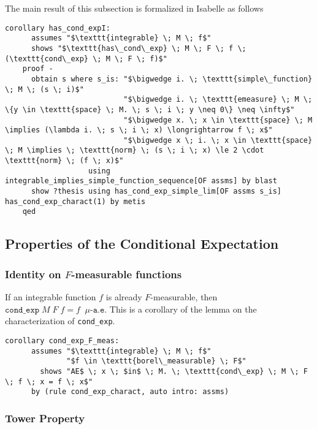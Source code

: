 The main result of this subsection is formalized in Isabelle as follows

\begin{isacorollary}
{\small
	\begin{lstlisting}[style=isabelle]
	corollary has_cond_expI:
	  assumes "$\texttt{integrable} \; M \; f$"
	  shows "$\texttt{has\_cond\_exp} \; M \; F \; f \; (\texttt{cond\_exp} \; M \; F \; f)$"
	proof -
	  obtain s where s_is: "$\bigwedge i. \; \texttt{simple\_function} \; M \; (s \; i)$" 
	  					   "$\bigwedge i. \; \texttt{emeasure} \; M \; \{y \in \texttt{space} \; M. \; s \; i \; y \neq 0\} \neq \infty$" 
						   "$\bigwedge x. \; x \in \texttt{space} \; M \implies (\lambda i. \; s \; i \; x) \longrightarrow f \; x$" 
						   "$\bigwedge x \; i. \; x \in \texttt{space} \; M \implies \; \texttt{norm} \; (s \; i \; x) \le 2 \cdot \texttt{norm} \; (f \; x)$" 
				   using integrable_implies_simple_function_sequence[OF assms] by blast
	  show ?thesis using has_cond_exp_simple_lim[OF assms s_is] has_cond_exp_charact(1) by metis
	qed
	\end{lstlisting}
}
\end{isacorollary}

\subsection{Properties of the Conditional Expectation}

\subsubsection{Identity on $F$-measurable functions}

If an integrable function $f$ is already $F$-measurable, then $\texttt{cond\_exp} \; M \; F \; f = f \;\;\mu\texttt{-a.e.}$ This is a corollary of the lemma on the characterization of \texttt{cond\_exp}.
\begin{isacorollary}
{\small
	\begin{lstlisting}[style=isabelle]
	corollary cond_exp_F_meas:
	  assumes "$\texttt{integrable} \; M \; f$"
			  "$f \in \texttt{borel\_measurable} \; F$"
		shows "AE$ \; x \; $in$ \; M. \; \texttt{cond\_exp} \; M \; F \; f \; x = f \; x$"
	  by (rule cond_exp_charact, auto intro: assms)
	\end{lstlisting}
}
\end{isacorollary}

\subsubsection{Tower Property}

